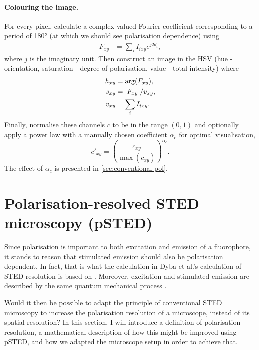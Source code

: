 
\paragraph{Colouring the image.} For every pixel, calculate a complex-valued Fourier coefficient corresponding to a period of \ang{180} (at which we should see polarisation dependence) using
\begin{align}
	F_{xy} &= \sum_i I_{ixy} e^{j2\theta_i},
\end{align}
where $ j $ is the imaginary unit. Then construct an image in the HSV (hue - orientation, saturation - degree of polarisation, value - total intensity) where 
\begin{align}
	h_{xy} &= \arg (F_{xy}),\\
	s_{xy} &= \abs{F_{xy}}/v_{xy},\\
	v_{xy} &= \sum_i I_{ixy}.
\end{align}
Finally, normalise these channels $ c $ to be in the range $ (0,1) $ and optionally apply a power law with a manually chosen coefficient $ \alpha_c $ for optimal visualisation,
\begin{equation}
	c'_{xy} = \left( \frac{c_{xy}}{\max (c_{xy})} \right)^{\alpha_c}.
\end{equation}
The effect of $ \alpha_c $ is presented in \autoref{sec:conventional pol}. 

\section{Polarisation-resolved STED microscopy (pSTED)}
\label{sec:methods psted}

Since polarisation is important to both excitation and emission of a fluorophore, it stands to reason that stimulated emission should also be polarisation dependent. In fact, that is what the calculation in Dyba et al.'s calculation of STED resolution is based on \cite{Harke2008, Dyba2005}. Moreover, excitation and stimulated emission are described by the same quantum mechanical process \cite{Foot}.

Would it then be possible to adapt the principle of conventional STED microscopy to increase the polarisation resolution of a microscope, instead of its spatial resolution? In this section, I will introduce a definition of polarisation resolution, a mathematical description of how this might be improved using pSTED, and how we adapted the microscope setup in order to achieve that. 

